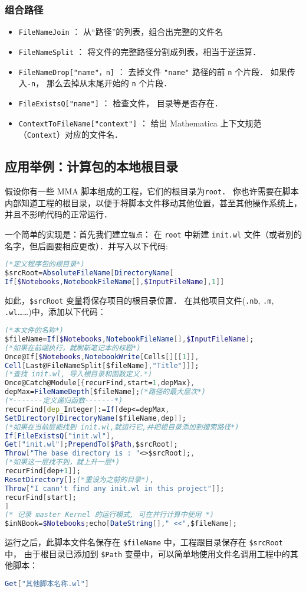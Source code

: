 \subsubsection{组合路径}

\begin{itemize}
\item \verb`FileNameJoin` ： 从“路径”的列表，组合出完整的文件名
\item \verb`FileNameSplit` ： 将文件的完整路径分割成列表，相当于逆运算．
\item \verb`FileNameDrop["name"，n]` ： 去掉文件 \verb`"name"` 路径的前 \verb`n` 个片段． 
如果传入\verb`-n`， 那么去掉从末尾开始的 \verb`n` 个片段．
\item \verb`FileExistsQ["name"]`  ： 检查文件， 目录等是否存在．
\item \verb`ContextToFileName["context"]`  ： 给出 Mathematica 上下文规范（\verb`Context`）对应的文件名．
\end{itemize}

\subsection{应用举例：计算包的本地根目录}

假设你有一些 MMA 脚本组成的工程，它们的根目录为\verb`root`．
你也许需要在脚本内部知道工程的根目录，以便于将脚本文件移动其他位置，甚至其他操作系统上，并且不影响代码的正常运行．

一个简单的实现是：首先我们建立\verb`锚点`：
在 \verb`root` 中新建 \verb`init.wl` 文件（或者别的名字，但后面要相应更改）．并写入以下代码:
\begin{lstlisting}[language=mathematica]
(*定义程序包的根目录*)
$srcRoot=AbsoluteFileName[DirectoryName[
If[$Notebooks,NotebookFileName[],$InputFileName],1]]
\end{lstlisting}
如此，\verb`$srcRoot` 变量将保存项目的根目录位置．
在其他项目文件(\verb`.nb`, \verb`.m`, \verb`.wl`……)中，添加以下代码：
\begin{lstlisting}[language=mathematica]
(*本文件的名称*)
$fileName=If[$Notebooks,NotebookFileName[],$InputFileName];
(*如果在前端执行，就刷新笔记本的标题*)
Once@If[$Notebooks,NotebookWrite[Cells[][[1]],
Cell[Last@FileNameSplit[$fileName],"Title"]]];
(*查找 init.wl, 导入根目录和函数定义.*)
Once@Catch@Module[{recurFind,start=1,depMax},
depMax=FileNameDepth[$fileName];(*路径的最大层次*)
(*-------定义递归函数-------*)
recurFind[dep_Integer]:=If[dep<=depMax,
SetDirectory[DirectoryName[$fileName,dep]];
(*如果在当前层能找到 init.wl,就运行它,并把根目录添加到搜索路径*)
If[FileExistsQ["init.wl"],
Get["init.wl"];PrependTo[$Path,$srcRoot];
Throw["The base directory is : "<>$srcRoot];,
(*如果这一层找不到，就上升一层*)
recurFind[dep+1]];
ResetDirectory[];(*重设为之前的目录*),
Throw["I cann't find any init.wl in this project"]];
recurFind[start];
]
(* 记录 master Kernel 的运行模式, 可在并行计算中使用 *)
$inNBook=$Notebooks;echo[DateString[]," <<",$fileName];
\end{lstlisting}
运行之后，此脚本文件名保存在 \verb`$fileName` 中，工程跟目录保存在 \verb`$srcRoot` 中，
由于根目录已添加到 \verb`$Path` 变量中，可以简单地使用文件名调用工程中的其他脚本：
\begin{lstlisting}[language=mathematica]
Get["其他脚本名称.wl"]
\end{lstlisting}
